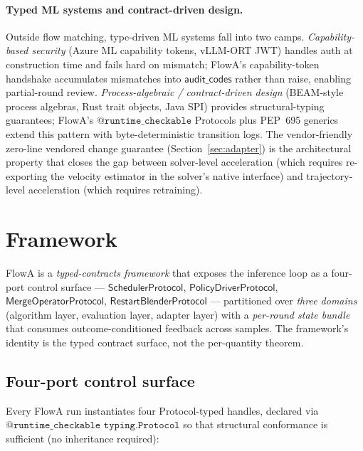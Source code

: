 \documentclass[journal,twocolumn,final]{IEEEtran}
\begin{document}
\paragraph{Typed ML systems and contract-driven design.}
Outside flow matching, type-driven ML systems fall into two camps.
\emph{Capability-based security} (Azure ML capability tokens, vLLM-ORT JWT)
handles auth at construction time and fails hard on mismatch; FlowA's
capability-token handshake accumulates mismatches into $\mathsf{audit\_codes}$
rather than raise, enabling partial-round review. \emph{Process-algebraic /
contract-driven design} (BEAM-style process algebras, Rust trait objects, Java
SPI) provides structural-typing guarantees; FlowA's
$\texttt{@runtime\_checkable}$ Protocols plus PEP~695 generics extend this
pattern with byte-deterministic transition logs. The vendor-friendly
zero-line vendored change guarantee (Section~\ref{sec:adapter}) is the
architectural property that closes the gap between solver-level acceleration
(which requires re-exporting the velocity estimator in the solver's native
interface) and trajectory-level acceleration (which requires retraining).

\section{Framework}\label{sec:framework}

FlowA is a \emph{typed-contracts framework} that exposes the inference loop as
a four-port control surface --- $\mathsf{SchedulerProtocol}$,
$\mathsf{PolicyDriverProtocol}$, $\mathsf{MergeOperatorProtocol}$,
$\mathsf{RestartBlenderProtocol}$ --- partitioned over \emph{three domains}
(algorithm layer, evaluation layer, adapter layer) with a \emph{per-round
state bundle} that consumes outcome-conditioned feedback across samples. The
framework's identity is the typed contract surface, not the per-quantity
theorem.

\subsection{Four-port control surface}

Every FlowA run instantiates four Protocol-typed handles, declared via
$\texttt{@runtime\_checkable}$ $\texttt{typing.Protocol}$ so that structural
conformance is sufficient (no inheritance required):
\end{document}
